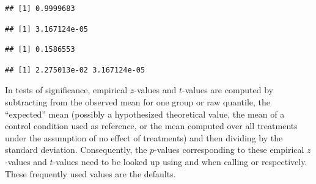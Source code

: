 \documentclass[krantz2]{krantz}\usepackage{knitr}
\begin{document}
\begin{knitrout}\footnotesize
{}\color{fgcolor}\begin{kframe}
\begin{alltt}
\hlstd{(} \hlstd{=} \hlstd{,}  \hlstd{=} \hlstd{,}  \hlstd{=} \hlstd{)}
\end{alltt}
\begin{verbatim}
## [1] 0.9999683
\end{verbatim}
\begin{alltt}
\hlstd{(} \hlstd{=} \hlstd{,}  \hlstd{=} \hlstd{,}  \hlstd{=} \hlstd{,}  \hlstd{=} \hlstd{)}
\end{alltt}
\begin{verbatim}
## [1] 3.167124e-05
\end{verbatim}
\begin{alltt}
\hlstd{(} \hlstd{=} \hlstd{,}  \hlstd{=} \hlstd{,}  \hlstd{=} \hlstd{,}  \hlstd{=} \hlstd{)}
\end{alltt}
\begin{verbatim}
## [1] 0.1586553
\end{verbatim}
\begin{alltt}
\hlstd{(} \hlstd{=} \hlstd{(}\hlstd{,} \hlstd{),}  \hlstd{=} \hlstd{,}  \hlstd{=} \hlstd{,}  \hlstd{=} \hlstd{)}
\end{alltt}
\begin{verbatim}
## [1] 2.275013e-02 3.167124e-05
\end{verbatim}
\end{kframe}
\end{knitrout}

\begin{explainbox}
  In tests of significance, empirical $z$-values and $t$-values are computed by subtracting from the observed mean for one group or raw quantile, the ``expected'' mean (possibly a hypothesized theoretical value, the mean of a control condition used as reference, or the mean computed over all treatments under the assumption of no effect of treatments) and then dividing by the standard deviation. Consequently, the $p$-values corresponding to these empirical $z$-values and $t$-values need to be looked up using  and  when calling  or  respectively. These frequently used values are the defaults.
\end{explainbox}
\end{document}
